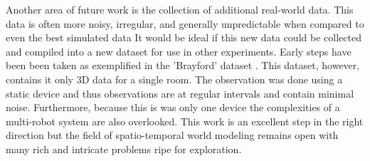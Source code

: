     Another area of future work is the collection
    of additional real-world data. This data is often more noisy, irregular,
    and generally unpredictable when compared to even the best simulated data
    It would be ideal if this new data could be collected and compiled into a
    new dataset for use in other experiments. Early steps have been been taken as exemplified in the
    'Brayford' dataset \cite{Krajnik2014}. This dataset, however, contains
    it only 3D data for a single room. The observation was done using a static device and
    thus observations are at regular intervals and contain minimal noise.
    Furthermore, because this is was only one device the complexities of a
    multi-robot system are also overlooked. This work is an excellent step
    in the right direction but the field of spatio-temporal world modeling
    remains open with many rich and intricate problems ripe for exploration.


